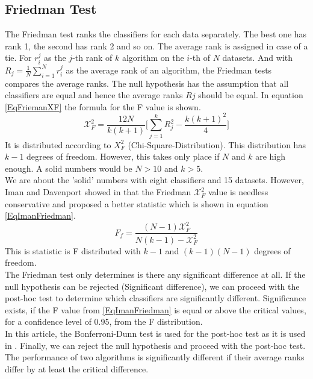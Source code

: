 \subsection{Friedman Test}
The Friedman test ranks the classifiers for each data separately. The best one has rank 1, the second has rank 2 and so on.
The average rank is assigned in case of a tie. For $r_i^j$ as the $j$-th rank of $k$ algorithm on the $i$-th of $N$ datasets.
And with $R_j = \frac{1}{N}\sum_{i=1}^{N}r_i^j$ as the average rank of an algorithm, the Friedman tests compares the average ranks.
The null hypothesis has the assumption that all classifiers are equal and hence the average ranks $Rj$ should be equal.
In equation \eqref{EqFriemanXF} the formula for the F value is shown.
\begin{equation}\label{EqFriemanXF}
	\mathcal{X}_F^2 = \frac{12N}{k(k+1)}\Bigg[\sum_{j=1}^{k}R_j^2 - \frac{k(k+1)^2}{4} \Bigg]
\end{equation}
It is distributed according to $X_F^2$ (Chi-Square-Distribution).
This distribution has $k-1$ degrees of freedom. However, this takes only place if $N$ and $k$ are high enough.
A solid numbers would be $N>10$ and $k>5$. \cite[p. 11]{JanezDemsar.2006}\\ We are about the 'solid' numbers with eight classifiers and 15 datasets.
However, Iman and Davenport showed in \cite{RonaldL.Iman.} that the Friedman $\mathcal{X}_F^2$ value is needless conservative and proposed a better statistic which is shown in equation \eqref{EqImanFriedman}.\cite[p. 11]{JanezDemsar.2006}
\begin{equation}\label{EqImanFriedman}
	F_f= \frac{(N-1)\mathcal{X}_F^2}{N(k-1)-\mathcal{X}_F^2}
\end{equation}
This is statistic is F distributed with $k-1$ and $(k-1)(N-1)$ degrees of freedom.\\
The Friedman test only determines is there any significant difference at all. 
If the null hypothesis can be rejected (Significant difference), we can proceed with the post-hoc test to determine which classifiers are significantly different.
Significance exists, if the F value from \eqref{EqImanFriedman} is equal or above the critical values, for a confidence level of 0.95, from the F distribution.\cite[p.11]{JanezDemsar.2006}\\
In this article, the Bonferroni-Dunn test is used for the post-hoc test as it is used in \cite{Chen.2009}.
Finally, we can reject the null hypothesis and proceed with the post-hoc test.
The performance of two algorithms is significantly different if their average ranks differ by at least the critical difference. 
